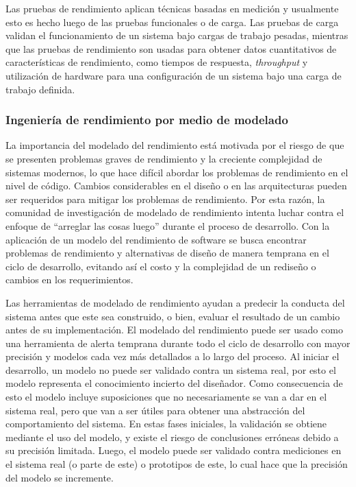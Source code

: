 Las pruebas de rendimiento aplican técnicas basadas en medición y usualmente esto es hecho luego de las pruebas funcionales o de carga. Las pruebas de carga validan el funcionamiento de un sistema bajo cargas de trabajo pesadas, mientras que las pruebas de rendimiento son usadas para obtener datos cuantitativos de características de rendimiento, como tiempos de respuesta, \emph{throughput} y utilización de hardware para una configuración de un sistema bajo una carga de trabajo definida.

\subsubsection{Ingeniería de rendimiento por medio de modelado} 
La importancia del modelado del rendimiento está motivada por el riesgo de que se presenten problemas graves de rendimiento y la creciente complejidad de sistemas modernos, lo que hace difícil abordar los problemas de rendimiento en el nivel de código\cite{Reussner:2016:MSS:3036121}. Cambios considerables en el diseño o en las arquitecturas pueden ser requeridos para mitigar los problemas de rendimiento. Por esta razón, la comunidad de investigación de modelado de rendimiento intenta luchar contra el enfoque de ``arreglar las cosas luego'' durante el proceso de desarrollo. Con la aplicación de un modelo del rendimiento de software se busca encontrar problemas de rendimiento y alternativas de diseño de manera temprana en el ciclo de desarrollo, evitando así el costo y la complejidad de un rediseño o cambios en los requerimientos.

Las herramientas de modelado de rendimiento ayudan a predecir la conducta del sistema antes que este sea construido, o bien, evaluar el resultado de un cambio antes de su implementación. El modelado del rendimiento puede ser usado como una herramienta de alerta temprana durante todo el ciclo de desarrollo con mayor precisión y modelos cada vez más detallados a lo largo del proceso. Al iniciar el desarrollo, un modelo no puede ser validado contra un sistema real, por esto el modelo representa el conocimiento incierto del diseñador. Como consecuencia de esto el modelo incluye suposiciones que no necesariamente se van a dar en el sistema real, pero que van a ser útiles para obtener una abstracción del comportamiento del sistema. En estas fases iniciales, la validación se obtiene mediante el uso del modelo, y existe el riesgo de conclusiones erróneas debido a su precisión limitada. Luego, el modelo puede ser validado contra mediciones en el sistema real (o parte de este) o prototipos de este, lo cual hace que la precisión del modelo se incremente.

